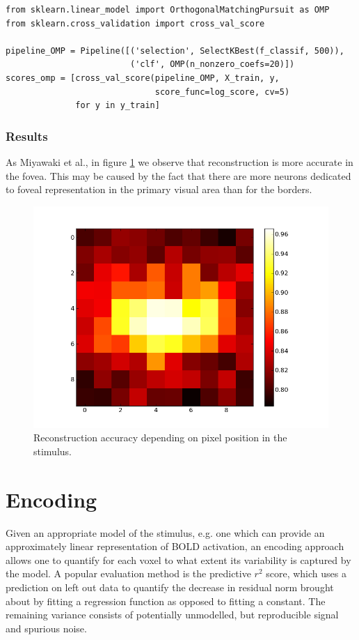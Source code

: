 \documentclass{frontiersSCNS} %
\begin{document}
\begin{lstlisting}
from sklearn.linear_model import OrthogonalMatchingPursuit as OMP
from sklearn.cross_validation import cross_val_score

pipeline_OMP = Pipeline([('selection', SelectKBest(f_classif, 500)),
                         ('clf', OMP(n_nonzero_coefs=20)])
scores_omp = [cross_val_score(pipeline_OMP, X_train, y,
                              score_func=log_score, cv=5)
              for y in y_train]
\end{lstlisting}

\subsubsection{Results}

As Miyawaki et al., in figure \ref{fig:omp} we observe that reconstruction
is more accurate in the fovea. This
may be caused by the fact that there are more neurons dedicated to foveal
representation in the primary visual area than for the borders.

\begin{figure}[hbtp]
  \begin{center}
    \includegraphics[width=.3\linewidth]{img/logistic_l1_scores.png}
  \end{center}
  \caption{Reconstruction accuracy depending on pixel
           position in the stimulus.}
\label{fig:omp}
\end{figure}

\section{Encoding}
Given an appropriate model of the stimulus, e.g. one which can provide an approximately linear representation of BOLD activation, an encoding approach allows one to quantify for each voxel to what extent its variability is captured by the model. A popular evaluation method is the predictive \(r^2\) score, which uses a prediction on left out data to quantify the decrease in residual norm brought about by fitting a regression function as opposed to fitting a constant. %
The remaining variance consists of potentially unmodelled, but reproducible signal and spurious noise.
\end{document}
